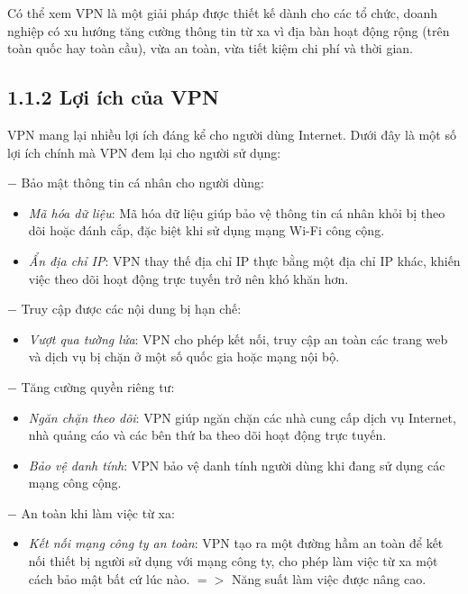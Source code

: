     Có thể xem VPN là một giải pháp được thiết kế dành cho các tổ chức, doanh nghiệp có xu hướng tăng cường thông tin từ xa vì địa bàn hoạt động rộng (trên toàn quốc hay toàn cầu), vừa an toàn, vừa tiết kiệm chi phí và thời gian.
    \subsection*{1.1.2 Lợi ích của VPN}

    VPN mang lại nhiều lợi ích đáng kể cho người dùng Internet. Dưới đây là một số lợi ích chính mà VPN đem lại cho người sử dụng:

    $-$ Bảo mật thông tin cá nhân cho người dùng:
    \begin{itemize}
        \item \textit{Mã hóa dữ liệu}: Mã hóa dữ liệu giúp bảo vệ thông tin cá nhân khỏi bị theo dõi hoặc đánh cắp, đặc biệt khi sử dụng mạng Wi-Fi công cộng.
        \item \textit{Ẩn địa chỉ IP}: VPN thay thế địa chỉ IP thực bằng một địa chỉ IP khác, khiến việc theo dõi hoạt động trực tuyến trở nên khó khăn hơn.
    \end{itemize}

    $-$ Truy cập được các nội dung bị hạn chế:
    \begin{itemize}
        \item \textit{Vượt qua tường lửa}: VPN cho phép kết nối, truy cập an toàn các trang web và dịch vụ bị chặn ở một số quốc gia hoặc mạng nội bộ.
    \end{itemize}

    $-$ Tăng cường quyền riêng tư:
    \begin{itemize}
        \item \textit{Ngăn chặn theo dõi}: VPN giúp ngăn chặn các nhà cung cấp dịch vụ Internet, nhà quảng cáo và các bên thứ ba theo dõi hoạt động trực tuyến.
        \item \textit{Bảo vệ danh tính}: VPN bảo vệ danh tính người dùng khi đang sử dụng các mạng công cộng.
    \end{itemize}

    $-$ An toàn khi làm việc từ xa:
    \begin{itemize}
        \item \textit{Kết nối mạng công ty an toàn}: VPN tạo ra một đường hầm an toàn để kết nối thiết bị người sử dụng với mạng công ty, cho phép làm việc từ xa một cách bảo mật bất cứ lúc nào. $=>$ Năng suất làm việc được nâng cao.
    \end{itemize}
